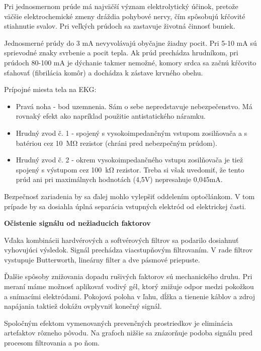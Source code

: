 \documentclass[titlepage,12pt]{article}
\begin{document}
Pri jednosmernom prúde má najväčší význam elektrolytický účinok, pretože väčšie elektrochemické zmeny dráždia pohybové nervy, čím spôsobujú kŕčovité stiahnutie svalov. Pri veľkých prúdoch sa zastavuje životná činnosť buniek.

Jednosmerné prúdy do 3 mA nevyvolávajú obyčajne žiadny pocit. Pri 5-10 mA sú sprievodné znaky svrbenie a pocit tepla. Ak prúd prechádza hrudníkom, pri prúdoch 80-100 mA je dýchanie takmer nemožné, komory srdca sa začnú kŕčovito sťahovať (fibrilácia komôr) a dochádza \linebreak k zástave krvného obehu.

Prípojné miesta tela na EKG:
\begin{itemize}
	\item Pravá noha - bod uzemnenia. Sám o sebe nepredstavuje nebezpečenstvo. Má rovnaký efekt ako napríklad použitie antistatického náramku.
	\item Hrudný zvod č. 1 - spojený s vysokoimpedančným vstupom zosilňovača a s batériou cez \SI{10}{\mega\ohm} rezistor (chráni pred nebezpečným prúdom).
	\item Hrudný zvod č. 2 - okrem vysokoimpedančného vstupu zosilňovača je tiež spojený \linebreak s výstupom cez \SI{100}{\kilo\ohm} rezistor. Treba si však uvedomiť, že tento prúd ani pri maximálnych hodnotách (4,5V) nepresahuje 0,045mA.
\end{itemize}

Bezpečnosť zariadenia by sa ďalej mohlo vylepšiť oddelením optočlánkom. V tom prípade by sa dosiahla úplná separácia vstupných elektród od elektrickej časti.
\newpage

\textbf{Očistenie signálu od nežiaducich faktorov}

Vďaka kombinácii hardvérových a softvérových filtrov sa podarilo dosiahnuť vyhovujúci výsledok. Signál prechádza viacstupňovým filtrovaním. V rade filtrov  vystupuje Butterworth, lineárny filter a dve pásmové priepuste. 

Ďalšie spôsoby znižovania dopadu rušivých faktorov sú mechanického druhu. Pri meraní máme možnosť aplikovať vodivý gél, ktorý znižuje odpor medzi pokožkou a snímacími elektródami. Pokojová poloha v ľahu, dĺžka a tienenie káblov a zdroj napájania taktiež dokážu ovplyvniť konečný signál.

Spoločným efektom vymenovaných prevenčných prostriedkov je eliminácia artefaktov rôzneho pôvodu. Na grafoch nižšie sa znázorňuje podoba signálu pred procesom filtrovania a po ňom.
\end{document}
